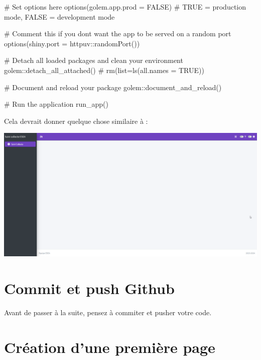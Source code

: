 \documentclass[
  letterpaper,
  DIV=11,
  numbers=noendperiod]{scrreprt}
\newenvironment{Shaded}{\begin{snugshade}}{\end{snugshade}}
\newcommand{\AttributeTok}[1]{\textcolor[rgb]{0.40,0.45,0.13}{#1}}
\newcommand{\CommentTok}[1]{\textcolor[rgb]{0.37,0.37,0.37}{#1}}
\newcommand{\ConstantTok}[1]{\textcolor[rgb]{0.56,0.35,0.01}{#1}}
\newcommand{\FunctionTok}[1]{\textcolor[rgb]{0.28,0.35,0.67}{#1}}
\newcommand{\NormalTok}[1]{\textcolor[rgb]{0.00,0.23,0.31}{#1}}
\newcommand{\SpecialCharTok}[1]{\textcolor[rgb]{0.37,0.37,0.37}{#1}}
\begin{document}
\begin{Shaded}
\begin{Highlighting}[]
\CommentTok{\# Set options here}
\FunctionTok{options}\NormalTok{(}\AttributeTok{golem.app.prod =} \ConstantTok{FALSE}\NormalTok{) }\CommentTok{\# TRUE = production mode, FALSE = development mode}

\CommentTok{\# Comment this if you don\textquotesingle{}t want the app to be served on a random port}
\FunctionTok{options}\NormalTok{(}\AttributeTok{shiny.port =}\NormalTok{ httpuv}\SpecialCharTok{::}\FunctionTok{randomPort}\NormalTok{())}

\CommentTok{\# Detach all loaded packages and clean your environment}
\NormalTok{golem}\SpecialCharTok{::}\FunctionTok{detach\_all\_attached}\NormalTok{()}
\CommentTok{\# rm(list=ls(all.names = TRUE))}

\CommentTok{\# Document and reload your package}
\NormalTok{golem}\SpecialCharTok{::}\FunctionTok{document\_and\_reload}\NormalTok{()}

\CommentTok{\# Run the application}
\FunctionTok{run\_app}\NormalTok{()}
\end{Highlighting}
\end{Shaded}

Cela devrait donner quelque chose similaire à :

\includegraphics{./images/esea_squelette_vide.png}

\hypertarget{commit-et-push-github}{%
\section{Commit et push Github}\label{commit-et-push-github}}

Avant de passer à la suite, pensez à commiter et pusher votre code.

\hypertarget{cruxe9ation-dune-premiuxe8re-page}{%
\section{Création d'une première
page}\label{cruxe9ation-dune-premiuxe8re-page}}
\end{document}
